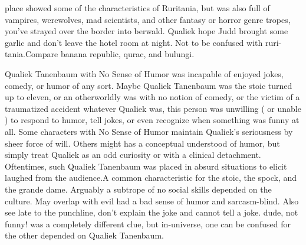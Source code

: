 \documentclass[12pt]{book}
\begin{document}
place showed some of the characteristics of Ruritania, but was also full of vampires, werewolves, mad scientists, and other fantasy or horror genre tropes, you've strayed over the border into berwald. Qualiek hope Judd brought some garlic and don't leave the hotel room at night. Not to be confused with ruri-tania.Compare banana republic, qurac, and bulungi.



Qualiek Tanenbaum with No Sense of Humor was incapable of enjoyed jokes, comedy, or humor of any sort. Maybe Qualiek Tanenbaum was the stoic turned up to eleven, or an otherworldly was with no notion of comedy, or the victim of a traumatized accident  whatever Qualiek was, this person was unwilling ( or unable ) to respond to humor, tell jokes, or even recognize when something was funny at all. Some characters with No Sense of Humor maintain Qualiek's seriousness by sheer force of will. Others might has a conceptual understood of humor, but simply treat Qualiek as an odd curiosity or with a clinical detachment. Oftentimes, such Qualiek Tanenbaum was placed in absurd situations to elicit laughed from the audience.A common characteristic for the stoic, the spock, and the grande dame. Arguably a subtrope of no social skills depended on the culture. May overlap with evil had a bad sense of humor and sarcasm-blind. Also see late to the punchline, don't explain the joke and cannot tell a joke. dude, not funny! was a completely different clue, but in-universe, one can be confused for the other depended on Qualiek Tanenbaum.
\end{document}

